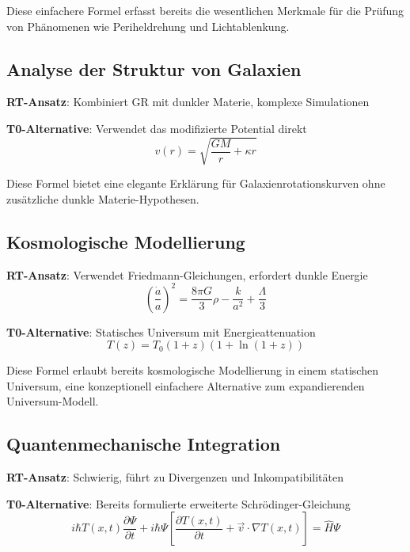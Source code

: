 \documentclass[12pt,a4paper]{article}
\newcommand{\Tfieldt}{T(x,t)}
\begin{document}
	Diese einfachere Formel erfasst bereits die wesentlichen Merkmale für die Prüfung von Phänomenen wie Periheldrehung und Lichtablenkung.
	
	\subsection{Analyse der Struktur von Galaxien}
	\label{subsec:galactic_structure}
	
	\textbf{RT-Ansatz}: Kombiniert GR mit dunkler Materie, komplexe Simulationen
	
	\textbf{T0-Alternative}: Verwendet das modifizierte Potential direkt
	\begin{equation}
		v(r) = \sqrt{\frac{GM}{r} + \kappa r}
	\end{equation}
	
	Diese Formel bietet eine elegante Erklärung für Galaxienrotationskurven ohne zusätzliche dunkle Materie-Hypothesen.
	
	\subsection{Kosmologische Modellierung}
	\label{subsec:cosmological_modeling}
	
	\textbf{RT-Ansatz}: Verwendet Friedmann-Gleichungen, erfordert dunkle Energie
	\begin{equation}
		\left(\frac{\dot{a}}{a}\right)^2 = \frac{8\pi G}{3}\rho - \frac{k}{a^2} + \frac{\Lambda}{3}
	\end{equation}
	
	\textbf{T0-Alternative}: Statisches Universum mit Energieattenuation
	\begin{equation}
		T(z) = T_0 (1+z)(1+\ln(1+z))
	\end{equation}
	
	Diese Formel erlaubt bereits kosmologische Modellierung in einem statischen Universum, eine konzeptionell einfachere Alternative zum expandierenden Universum-Modell.
	
	\subsection{Quantenmechanische Integration}
	\label{subsec:quantum_integration}
	
	\textbf{RT-Ansatz}: Schwierig, führt zu Divergenzen und Inkompatibilitäten
	
	\textbf{T0-Alternative}: Bereits formulierte erweiterte Schrödinger-Gleichung
	\begin{equation}
		i\hbar \Tfieldt \frac{\partial\Psi}{\partial t} + i\hbar \Psi \left[\frac{\partial \Tfieldt}{\partial t} + \vec{v}\cdot\nabla\Tfieldt\right] = \hat{H} \Psi
	\end{equation}
	
\end{document}
